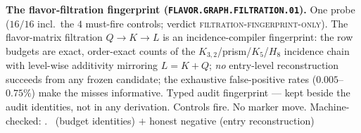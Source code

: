 \par\smallskip\noindent\textbf{The flavor-filtration fingerprint
(\texttt{FLAVOR.GRAPH.FILTRATION.01}).}
One probe ($16/16$ incl.\ the $4$ must-fire controls; verdict
\textsc{filtration-fingerprint-only}).  The flavor-matrix
filtration $Q\to K\to L$ is an incidence-compiler fingerprint: the
row budgets are exact, order-exact counts of the
$K_{3,2}$/prism/$K_5$/$H_8$ incidence chain with level-wise
additivity mirroring $L=K+Q$; \emph{no} entry-level reconstruction
succeeds from any frozen candidate; the exhaustive false-positive
rates ($0.005$--$0.75\%$) make the misses informative.  Typed
audit fingerprint --- kept beside the audit identities, not in any
derivation.  Controls fire.  No marker move.
Machine-checked: .
\mE\ (budget identities) $+$ honest negative (entry
reconstruction)
\par\smallskip
